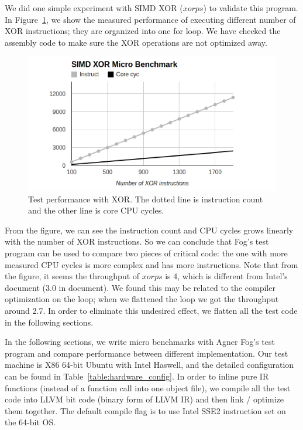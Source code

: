 We did one simple experiment with SIMD XOR ($xorps$) to validate this program. In Figure~\ref{figure:testp_xor}, we show the measured performance of executing different number of XOR instructions; they are organized into one for loop. We have checked the assembly code to make sure the XOR operations are not optimized away.

\begin{figure}[ht!]
\centering
\includegraphics[width=140mm]{draw/testp_xor.png}
\caption[Test Performance with XOR]{Test performance with XOR\@. The dotted line is instruction count and the other line is core CPU cycles.}
\label{figure:testp_xor}
\end{figure}

From the figure, we can see the instruction count and CPU cycles grows linearly with the number of XOR instructions. So we can conclude that Fog's test program can be used to compare two pieces of critical code: the one with more measured CPU cycles is more complex and has more instructions. Note that from the figure, it seems the throughput of $xorps$ is 4, which is different from Intel's document (3.0 in document). We found this may be related to the compiler optimization on the loop; when we flattened the loop we got the throughput around 2.7. In order to eliminate this undesired effect, we flatten all the test code in the following sections.

In the following sections, we write micro benchmarks with Agner Fog's test program and compare performance between different implementation. Our test machine is X86 64-bit Ubuntu with Intel Haswell, and the detailed configuration can be found in Table~\ref{table:hardware_config}. In order to inline pure IR functions (instead of a function call into one object file), we compile all the test code into LLVM bit code (binary form of LLVM IR) and then link / optimize them together. The default compile flag is to use Intel SSE2 instruction set on the 64-bit OS.

